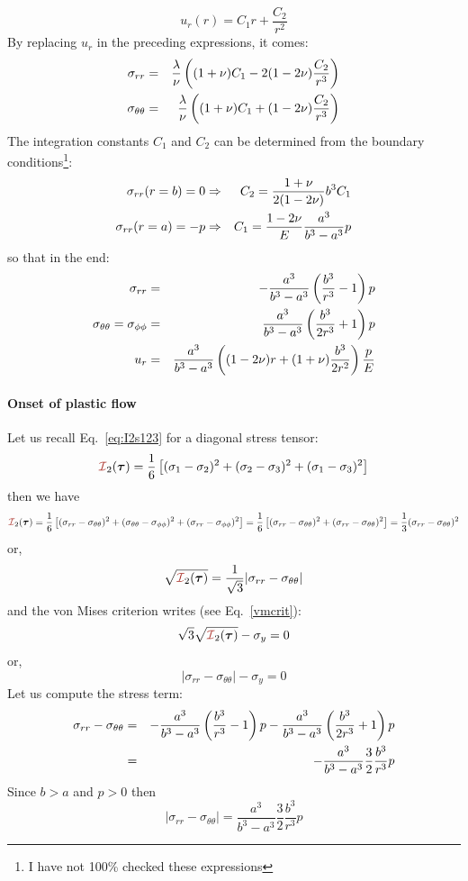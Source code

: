 \[
u_r(r) = C_1 r + \frac{C_2}{r^2}
\]
By replacing $u_r$ in the preceding expressions, it comes:
\begin{eqnarray}
\sigma_{rr} &=& \frac{\lambda}{\nu}
\left((1+\nu)C_1 - 2(1-2\nu)\frac{C_2}{r^3}\right) \nonumber\\
\sigma_{\theta\theta} &=& \frac{\lambda}{\nu}
\left((1+\nu)C_1 + (1-2\nu)\frac{C_2}{r^3}\right) \nonumber 
\end{eqnarray}
The integration constants $C_1$ and $C_2$ can be determined from the boundary conditions\footnote{I have not 100\% checked these expressions}:
\begin{eqnarray}
\sigma_{rr}(r=b)=0 &\Rightarrow& 
C_2=\frac{1+\nu}{2(1-2\nu)}b^3 C_1 \nonumber\\
\sigma_{rr}(r=a)=-p &\Rightarrow& 
C_1=\frac{1-2\nu}{E}\frac{a^3}{b^3-a^3}p \nonumber
\end{eqnarray}
so that in the end:
\begin{eqnarray}
\sigma_{rr} &=& -\frac{a^3}{b^3-a^3} \left( \frac{b^3}{r^3}-1 \right) p \nonumber\\
\sigma_{\theta\theta}=\sigma_{\phi\phi} &=& \frac{a^3}{b^3-a^3} \left( \frac{b^3}{2r^3}+1 \right) p \nonumber\\
u_r &=& \frac{a^3}{b^3-a^3}
\left( (1-2\nu)r+(1+\nu)\frac{b^3}{2r^2}  \right)\frac{p}{E}
\end{eqnarray}

\paragraph{Onset of plastic flow}

Let us recall Eq.~\eqref{eq:I2s123} for a diagonal stress tensor:
\[ 
{\III}_2({\bm \tau}) = \frac{1}{6}\left[(\sigma_{1}-\sigma_{2})^2 + (\sigma_{2}-\sigma_{3})^2 
+ (\sigma_{1}-\sigma_{3})^2 \right] 
\]
then we have
\[ 
{\III}_2({\bm \tau}) 
= \frac{1}{6}\left[(\sigma_{rr}-\sigma_{\theta\theta})^2 
+ (\sigma_{\theta\theta}-\sigma_{\phi\phi})^2 
+ (\sigma_{rr}-\sigma_{\phi\phi})^2 \right] 
=
\frac{1}{6}\left[(\sigma_{rr}-\sigma_{\theta\theta})^2 
+ (\sigma_{rr}-\sigma_{\theta\theta})^2 \right] 
=\frac13 (\sigma_{rr}-\sigma_{\theta\theta})^2 
\]
or, 
\[
\sqrt{{\III}_2({\bm \tau}) } = \frac{1}{\sqrt{3}} |\sigma_{rr}-\sigma_{\theta\theta}|
\]
and the von Mises criterion writes (see Eq.~\eqref{vmcrit}):
\[
\sqrt{3} \sqrt{{\III}_2({\bm \tau}) } - \sigma_y = 0
\]
or,
\[
|\sigma_{rr}-\sigma_{\theta\theta}|
- \sigma_y = 0
\]
Let us compute the stress term:
\begin{eqnarray}
\sigma_{rr}-\sigma_{\theta\theta}
&=& 
-\frac{a^3}{b^3-a^3} \left( \frac{b^3}{r^3}-1 \right) p 
-\frac{a^3}{b^3-a^3} \left( \frac{b^3}{2r^3}+1 \right) p \nonumber\\
&=& 
-\frac{a^3}{b^3-a^3}\frac32 \frac{b^3}{r^3}  p 
\end{eqnarray}
Since $b>a$ and $p>0$ then 
\[
| \sigma_{rr}-\sigma_{\theta\theta} |=
\frac{a^3}{b^3-a^3}\frac32 \frac{b^3}{r^3}  p 
\]

